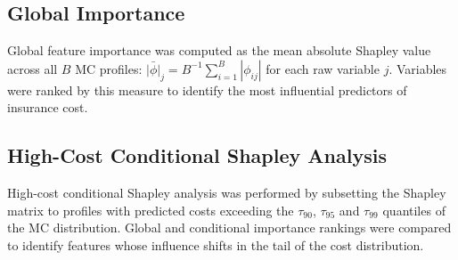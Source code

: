 \subsection{Global Importance}
\label{annexure:shap_global}

Global feature importance was computed as the mean absolute Shapley value across all $B$ MC profiles: $\bar{|\phi|}_j = B^{-1} \sum_{i=1}^{B} |\phi_{ij}|$ for each raw variable $j$. Variables were ranked by this measure to identify the most influential predictors of insurance cost.

\subsection{High-Cost Conditional Shapley Analysis}
\label{annexure:shap_conditional}

High-cost conditional Shapley analysis was performed by subsetting the Shapley matrix to profiles with predicted costs exceeding the $\tau_{90}$, $\tau_{95}$ and $\tau_{99}$ quantiles of the MC distribution. Global and conditional importance rankings were compared to identify features whose influence shifts in the tail of the cost distribution.
